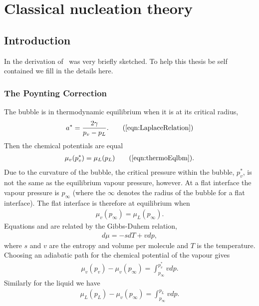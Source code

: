 \chapter{Classical nucleation theory}\label{app:CNT}

\section{Introduction}
In  the derivation of \cnt\ was very briefly sketched.
To help this thesis be self contained we fill in the details here.

\subsection{The Poynting Correction}
The bubble is in thermodynamic equilibrium when it is at its critical radius, 
\begin{align}
  \astar = \frac{2\gamma}{p_v-p_L}. \tag{\ref{eqn:LaplaceRelation}}
\end{align}
Then the chemical potentials are equal
\begin{align}
  \mu_v(p_v^\ast) = \mu_L(p_L)\tag{\ref{eqn:thermoEqlbm}}.
\end{align}
Due to the curvature of the bubble, the critical pressure within the bubble, $p_v^\ast$,
is not the same as the equilibrium vapour pressure, however.
At a flat interface the vapour pressure is  $p_\infty$ (where the $\infty$ denotes the radius of the bubble for a flat interface).
The flat interface is therefore at equilibrium when
\begin{align}
  \mu_v(p_{\infty}) =  \mu_L(p_{\infty}). \label{eqn:thermoEqlbmInfity}
\end{align}
Equations  and   are related by the Gibbs-Duhem relation,
\begin{align}
  d \mu = -s dT + v dp,
\end{align}
 where $s$ and $v$ are the entropy and volume per molecule and $T$ is the temperature.
Choosing an adiabatic path for the chemical potential of the vapour gives
\begin{align}
\mu_v(p_v) - \mu_v(p_{\infty}) =  \int_{p_{\infty}}^{p_v^\ast} v dp. \label{eqn:GDvapour} %
\end{align}
Similarly for the liquid we have
\begin{align}
\mu_L(p_L) - \mu_v(p_{\infty}) =  \int_{p_{\infty}}^{p_L} v dp.\label{eqn:GDLiquid}  %
\end{align}
